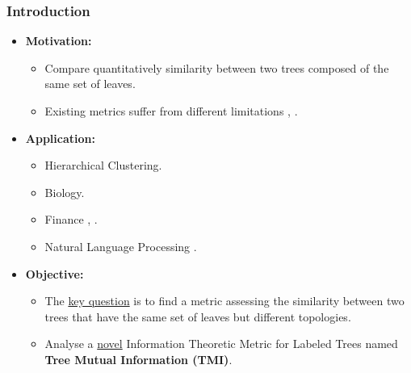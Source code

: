 \documentclass{tum-presentation}
\begin{document}
\begin{frame}
	\setcounter{framenumber}{2}
	\frametitle{Introduction}
	\begin{itemize}
		\item \textbf{\textcolor{TUMBlau}{Motivation:}} 
		\begin{itemize}
			\item Compare quantitatively similarity between two trees composed of the same set of leaves.
			\item Existing metrics suffer from different limitations \cite{RF2013}, \cite{Penny1982}. 
		\end{itemize}
		
		\item \textbf{\textcolor{TUMBlau}{Application:}} 
		\begin{itemize}
			\item Hierarchical Clustering.
			\item Biology. 
			\item Finance \cite{Papenbrock2011_1000025469}, \cite{Gallegati2008}.
			\item Natural Language Processing \cite{wordnet}.
		\end{itemize}
		
		\item \textbf{\textcolor{TUMBlau}{Objective:}} 
		\begin{itemize}
			\item The \underline{key question} is to find a metric assessing the similarity between two trees that have the same set of leaves but different topologies. 
			\item Analyse a \underline{novel} Information Theoretic Metric for Labeled Trees named \textbf{Tree Mutual Information (TMI)}.
		\end{itemize}
	\end{itemize}
		
\end{frame}
\end{document}
